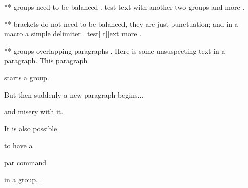 ** groups need to be balanced
.
test {text with {{another }two} groups } and more
.


** brackets do not need to be balanced, they are just punctuation; and in a macro a simple delimiter
.
test[ {t]]ext} more
.


** groups overlapping paragraphs
.
Here is some unsuspecting text in a paragraph. This paragraph { starts a group.

But then suddenly a new paragraph begins... } and misery with it.

It is also possible {to have a\par par command} in a group.
.
